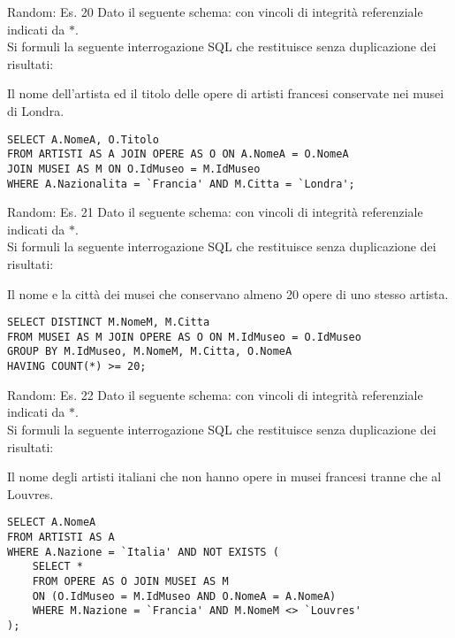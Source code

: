 %
\begin{frame}[fragile]{Random: Es. 20}
\vspace{-.5cm}
Dato il seguente schema:
\schemaMuseiOpereArtisti
con vincoli di integrit\`a referenziale indicati da $*$.
\newline
\\Si formuli la seguente interrogazione SQL che restituisce senza duplicazione dei risultati:

Il nome dell'artista ed il titolo delle opere di artisti francesi conservate nei musei di Londra.
\pause

\begin{lstlisting}   
SELECT A.NomeA, O.Titolo
FROM ARTISTI AS A JOIN OPERE AS O ON A.NomeA = O.NomeA
JOIN MUSEI AS M ON O.IdMuseo = M.IdMuseo
WHERE A.Nazionalita = `Francia' AND M.Citta = `Londra';
\end{lstlisting}
\end{frame}
%
\begin{frame}[fragile]{Random: Es. 21}
\vspace{-.5cm}
Dato il seguente schema:
\schemaMuseiOpereArtisti
con vincoli di integrit\`a referenziale indicati da $*$.
\newline
\\Si formuli la seguente interrogazione SQL che restituisce senza duplicazione dei risultati:

Il nome e la citt\`a dei musei che conservano almeno 20 opere di uno stesso artista.
\pause

\begin{lstlisting}   
SELECT DISTINCT M.NomeM, M.Citta
FROM MUSEI AS M JOIN OPERE AS O ON M.IdMuseo = O.IdMuseo
GROUP BY M.IdMuseo, M.NomeM, M.Citta, O.NomeA
HAVING COUNT(*) >= 20;
\end{lstlisting}
\end{frame}
%
\begin{frame}[fragile]{Random: Es. 22}
\vspace{-.5cm}
Dato il seguente schema:
\schemaMuseiOpereArtisti
con vincoli di integrit\`a referenziale indicati da $*$.
\newline
\\Si formuli la seguente interrogazione SQL che restituisce senza duplicazione dei risultati:

Il nome degli artisti italiani che non hanno opere in musei francesi tranne che al Louvres.
\pause

\begin{lstlisting}   
SELECT A.NomeA
FROM ARTISTI AS A
WHERE A.Nazione = `Italia' AND NOT EXISTS (
    SELECT *
    FROM OPERE AS O JOIN MUSEI AS M
    ON (O.IdMuseo = M.IdMuseo AND O.NomeA = A.NomeA)
    WHERE M.Nazione = `Francia' AND M.NomeM <> `Louvres'
);
\end{lstlisting}
\end{frame}